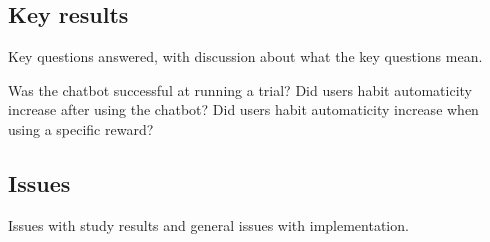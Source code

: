 \subsection{Key results}

Key questions answered, with discussion about what the key questions mean.\newline

\large{Was the chatbot successful at running a trial?}\newline
\large{Did users habit automaticity increase after using the chatbot?}\newline
\large{Did users habit automaticity increase when using a specific reward?}


\subsection{Issues}
Issues with study results and general issues with implementation.

